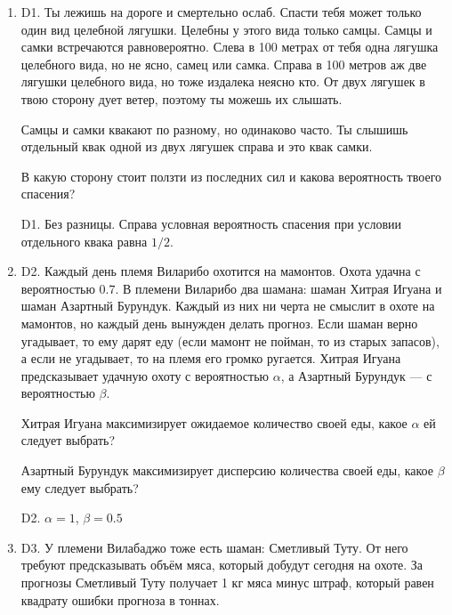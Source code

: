 \documentclass[12pt]{article}
\newenvironment{problem}{}{}
\newenvironment{sol}{}{} %
\begin{document}
\begin{enumerate}
\begin{problem}
\item[D1.] Ты лежишь на дороге и смертельно ослаб. Спасти тебя может только один вид  целебной лягушки. Целебны у этого вида только самцы. Самцы и самки встречаются равновероятно. Слева в 100 метрах от тебя одна лягушка целебного вида, но не ясно, самец или самка. Справа в 100 метров аж две лягушки целебного вида, но тоже издалека неясно кто. От двух лягушек в твою сторону дует ветер, поэтому ты можешь их слышать.

Самцы и самки квакают по разному, но одинаково часто. Ты слышишь отдельный квак одной из двух лягушек справа и это квак самки.

В какую сторону стоит ползти из последних сил и какова вероятность твоего спасения?

\begin{sol}
D1. Без разницы. Справа условная вероятность спасения при условии отдельного квака равна $1/2$.
\end{sol}
\end{problem}

\begin{problem}
\item[D2.] Каждый день племя Виларибо охотится на мамонтов. Охота удачна с вероятностью $0.7$. В племени Виларибо два шамана: шаман Хитрая Игуана и шаман Азартный Бурундук. Каждый из них ни черта не смыслит в охоте на мамонтов, но каждый день вынужден делать прогноз. Если шаман верно угадывает, то ему дарят еду (если мамонт не пойман, то из старых запасов), а если не угадывает, то на племя его громко ругается. Хитрая Игуана предсказывает удачную охоту с вероятностью $\alpha$, а Азартный Бурундук — с вероятностью $\beta$.

Хитрая Игуана максимизирует ожидаемое количество своей еды, какое $\alpha$ ей следует выбрать?

Азартный Бурундук максимизирует дисперсию количества своей еды, какое $\beta$ ему следует выбрать?

\begin{sol}
D2. $\alpha = 1$, $\beta=0.5$
\end{sol}
\end{problem}

\begin{problem}
\item[D3.] У племени Вилабаджо тоже есть шаман: Сметливый Туту. От него требуют предсказывать объём мяса, который добудут сегодня на охоте. За прогнозы Сметливый Туту получает 1 кг мяса минус штраф, который равен квадрату ошибки прогноза в тоннах. 


\end{problem}
\end{enumerate}
\end{document}
